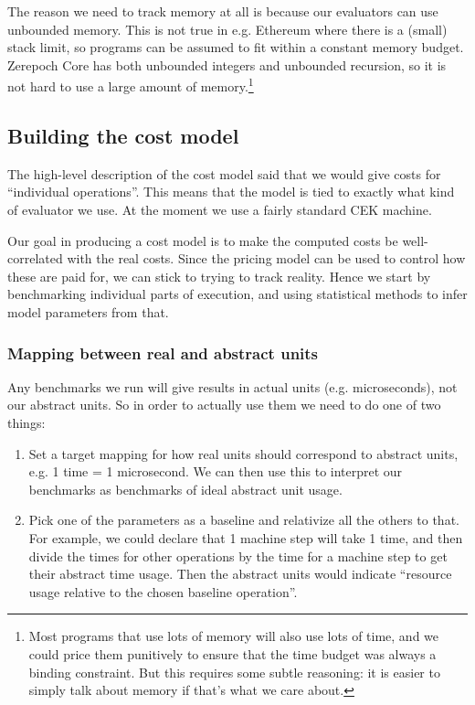 The reason we need to track memory at all is because our evaluators can use unbounded memory.
This is not true in e.g. Ethereum where there is a (small) stack limit, so programs can be assumed to fit within a constant memory budget.
Zerepoch Core has both unbounded integers and unbounded recursion, so it is not hard to use a large amount of memory.\footnote{
Most programs that use lots of memory will also use lots of time, and we could price them punitively to ensure that the time budget was always a binding constraint.
But this requires some subtle reasoning: it is easier to simply talk about memory if that's what we care about.
}

\subsection{Building the cost model}
The high-level description of the cost model said that we would give costs for ``individual operations''.
This means that the model is tied to exactly what kind of evaluator we use.
At the moment we use a fairly standard CEK machine.


Our goal in producing a cost model is to make the computed costs be well-correlated with the real costs.
Since the pricing model can be used to control how these are paid for, we can stick to trying to track reality.
Hence we start by benchmarking individual parts of execution, and using statistical methods to infer model parameters from that.

\subsubsection{Mapping between real and abstract units}
Any benchmarks we run will give results in actual units (e.g. microseconds), not our abstract units.
So in order to actually use them we need to do one of two things:
\begin{enumerate}
\item
  Set a target mapping for how real units should correspond to abstract units, e.g. 1 \gls{time} = 1 microsecond.
  We can then use this to interpret our benchmarks as benchmarks of ideal abstract unit usage.
\item
  Pick one of the parameters as a baseline and relativize all the others to that.
  For example, we could declare that 1 machine step will take 1 \gls{time}, and then divide the times for other operations by the time for a machine step to get their abstract \gls{time} usage.
  Then the abstract units would indicate ``resource usage relative to the chosen baseline operation''.
\end{enumerate}

